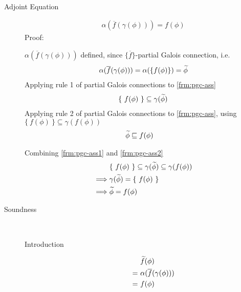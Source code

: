 \begin{proofatend}~
    \begin{description}
        \item[Adjoint Equation] 
        \begin{align*}
        \alpha(\overline{f}(\gamma(\phi))) = f(\phi)
        \end{align*}
        Proof:
        
        $\alpha(\overline{f}(\gamma(\phi)))$ defined, since $\{ \overline{f} \}$-partial Galois connection, i.e.
        \begin{align}
        \label{frm:pgc-ass}
        \alpha(\overline{f}(\gamma(\phi))) = \alpha(\{ f(\phi) \}) = \widetilde{\phi}
        \end{align}
        Applying rule 1 of partial Galois connections to \ref{frm:pgc-ass}
        \begin{align}
        \label{frm:pgc-ass1}
        &\{~ f(\phi) ~\} \subseteq \gamma(\widetilde{\phi})\\
        \end{align}
        Applying rule 2 of partial Galois connections to \ref{frm:pgc-ass}, using $\{~ f(\phi) ~\} \subseteq \gamma(f(\phi))$
        \begin{align}
        \label{frm:pgc-ass2}
        & \widetilde{\phi} \sqsubseteq f(\phi)
        \end{align}
        
        Combining \ref{frm:pgc-ass1} and \ref{frm:pgc-ass2}
        \begin{align*}
        &\{~ f(\phi) ~\} \subseteq \gamma(\widetilde{\phi}) \subseteq \gamma(f(\phi))\\
        \implies
        & \gamma(\widetilde{\phi}) = \{~ f(\phi) ~\}\\
        \implies
        & \widetilde{\phi} = f(\phi)
        \end{align*}
        
        \item[Soundness]~
        \begin{description}
            \item[Introduction] 
            \begin{align*}
            &\widetilde{f}(\phi)\\
            =~
            &\alpha(\overline{f}(\gamma(\phi)))\\
            =~ 
            &f(\phi)
            \end{align*}
            

\end{description}
\end{description}
\end{proofatend}
